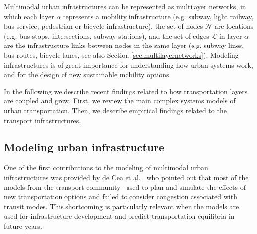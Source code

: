 Multimodal urban infrastructures can be represented as multilayer networks, in which each layer $\alpha$ represents a mobility infrastructure (e.g. subway, light railway, bus service, pedestrian or bicycle infrastructure), the set of nodes $\mathcal{N}$ are locations (e.g. bus stops, intersections, subway stations), and the set of edges $\mathcal{L}$ in layer $\alpha$ are the infrastructure links between nodes in the same layer (e.g. subway lines, bus routes, bicycle lanes, see also Section \ref{sec:multilayernetworks}). Modeling infrastructures is of great importance for understanding how urban systems work, and for the design of new sustainable mobility options. 

In the following we describe recent findings related to how transportation layers are coupled and grow. First, we review the main complex systems models of urban transportation. Then, we describe empirical findings related to the transport infrastructures.

\subsection{Modeling urban infrastructure}\label{sec:modelinginsrastructure}

One of the first contributions to the modeling of multimodal urban infrastructures was provided by de Cea et al.~\cite{decea2005equilibrium} who pointed out that most of the models from the transport community~\cite{boyce1994introducing,boyce2002sequential,decea2007} used to plan and simulate the effects of new transportation options and failed to consider congestion associated with transit modes. This shortcoming is particularly relevant when the models are used for infrastructure development and predict transportation equilibria in future years. 

